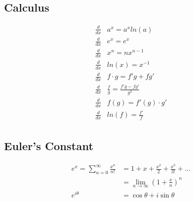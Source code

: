 \subsection{Calculus}
\begin{equation*}
    \begin{aligned}
        \frac{d}{dx} & a^x = a^x ln(a) \\
        \frac{d}{dx} & e^x = e^x  \\
        \frac{d}{dx} & x^n = nx^{n-1} \\
        \frac{d}{dx} & ln(x) = x^{-1} \\
        \frac{d}{dx} & f \cdot g = f'g + fg' \\
        \frac{d}{dx} & \frac{f}{g} = \frac{f'g - fg'}{g^2} \\
        \frac{d}{dx} & f(g) = f'(g) \cdot g' \\
        \frac{d}{dx} & ln(f) = \frac{f'}{f} \\
    \end{aligned}
\end{equation*}

\subsection{Euler's Constant}
\begin{equation*}
    \begin{aligned}
        e^x = \sum_{n=0}^{\infty} \frac{x^n}{n!} &= 1 + x + \frac{x^2}{2} +
        \frac{x^3}{3!} + \dots \\
            &= \lim_{n\to\infty} \left(1 + \frac{x}{n} \right)^n \\
        e^{i\theta} &= \cos\theta + i\sin\theta \\
    \end{aligned}
\end{equation*}

